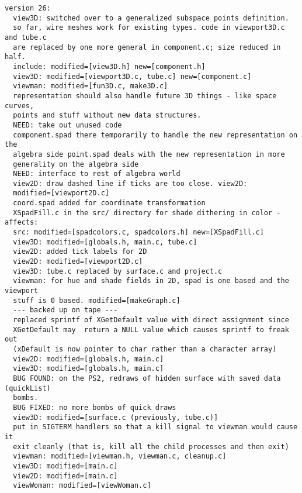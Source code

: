\documentclass{article}
\begin{document}
\begin{verbatim}
version 26:
  view3D: switched over to a generalized subspace points definition.
  so far, wire meshes work for existing types. code in viewport3D.c and tube.c
  are replaced by one more general in component.c; size reduced in half.
  include: modified=[view3D.h] new=[component.h]
  view3D: modified=[viewport3D.c, tube.c] new=[component.c]
  viewman: modified=[fun3D.c, make3D.c]
  representation should also handle future 3D things - like space curves,
  points and stuff without new data structures.
  NEED: take out unused code
  component.spad there temporarily to handle the new representation on the
  algebra side point.spad deals with the new representation in more
  generality on the algebra side
  NEED: interface to rest of algebra world
  view2D: draw dashed line if ticks are too close. view2D:
  modified=[viewport2D.c]
  coord.spad added for coordinate transformation
  XSpadFill.c in the src/ directory for shade dithering in color - affects:
  src: modified=[spadcolors.c, spadcolors.h] new=[XSpadFill.c]
  view3D: modified=[globals.h, main.c, tube.c]
  view2D: added tick labels for 2D
  view2D: modified=[viewport2D.c]
  view3D: tube.c replaced by surface.c and project.c
  viewman: for hue and shade fields in 2D, spad is one based and the viewport
  stuff is 0 based. modified=[makeGraph.c]
  --- backed up on tape ---
  replaced sprintf of XGetDefault value with direct assignment since
  XGetDefault may  return a NULL value which causes sprintf to freak out
  (xDefault is now pointer to char rather than a character array)
  view2D: modified=[globals.h, main.c]
  view3D: modified=[globals.h, main.c]
  BUG FOUND: on the PS2, redraws of hidden surface with saved data (quickList)
  bombs.
  BUG FIXED: no more bombs of quick draws
  view3D: modified=[surface.c (previously, tube.c)]
  put in SIGTERM handlers so that a kill signal to viewman would cause it
  exit cleanly (that is, kill all the child processes and then exit)
  viewman: modified=[viewman.h, viewman.c, cleanup.c]
  view3D: modified=[main.c]
  view2D: modified=[main.c]
  viewWoman: modified=[viewWoman.c]


\end{verbatim}
\end{document}
